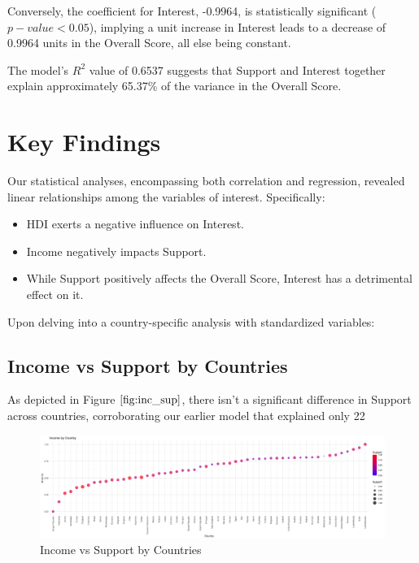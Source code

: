\documentclass[12pt]{article}
\begin{document}
Conversely, the coefficient for Interest, -0.9964, is statistically significant ($p-value < 0.05$), implying a unit increase in Interest leads to a decrease of 0.9964 units in the Overall Score, all else being constant.

The model's $R^2$ value of 0.6537 suggests that Support and Interest together explain approximately 65.37\% of the variance in the Overall Score.

\section{Key Findings}

Our statistical analyses, encompassing both correlation and regression, revealed linear relationships among the variables of interest. Specifically:

\begin{itemize}
\item HDI exerts a negative influence on Interest.
\item Income negatively impacts Support.
\item While Support positively affects the Overall Score, Interest has a detrimental effect on it.
\end{itemize}

Upon delving into a country-specific analysis with standardized variables:

\subsection{Income vs Support by Countries}

As depicted in Figure $\ref{fig:inc_sup}$, there isn't a significant difference in Support across countries, corroborating our earlier model that explained only 22%

\begin{figure}[htb]
\centering
\includegraphics[width=\linewidth]{images/income_support_by_country}
\caption{Income vs Support by Countries}
\label{fig:inc_sup}
\end{figure}
\end{document}
